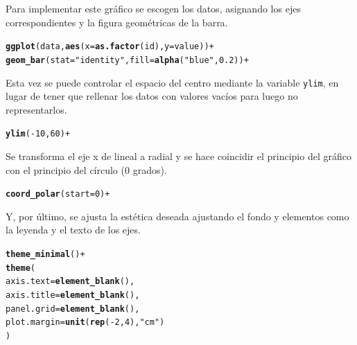 \documentclass{article}\usepackage[]{graphicx}\usepackage[]{color}
\makeatletter
\newcommand{\hlnum}[1]{\textcolor[rgb]{0.686,0.059,0.569}{#1}}%
\newcommand{\hlstr}[1]{\textcolor[rgb]{0.192,0.494,0.8}{#1}}%
\newcommand{\hlopt}[1]{\textcolor[rgb]{0,0,0}{#1}}%
\newcommand{\hlstd}[1]{\textcolor[rgb]{0.345,0.345,0.345}{#1}}%
\newcommand{\hlkwc}[1]{\textcolor[rgb]{0.333,0.667,0.333}{#1}}%
\newcommand{\hlkwd}[1]{\textcolor[rgb]{0.737,0.353,0.396}{\textbf{#1}}}%
\newenvironment{kframe}{%
 \def\at@end@of@kframe{}%
 \ifinner\ifhmode%
  \def\at@end@of@kframe{\end{minipage}}%
  \begin{minipage}{\columnwidth}%
 \fi\fi%
 \def\FrameCommand##1{\hskip\@totalleftmargin \hskip-\fboxsep
 \colorbox{shadecolor}{##1}\hskip-\fboxsep
     \hskip-\linewidth \hskip-\@totalleftmargin \hskip\columnwidth}%
 \MakeFramed {\advance\hsize-\width
   \@totalleftmargin\z@ \linewidth\hsize
   \@setminipage}}%
 {\par\unskip\endMakeFramed%
 \at@end@of@kframe}
\newenvironment{knitrout}{}{} %
\makeatother
\begin{document}
Para implementar este gr\'afico se escogen los datos, asignando los ejes correspondientes y la figura geom\'etricas de la barra.
\begin{knitrout}
\color{fgcolor}\begin{kframe}
\begin{alltt}
\hlkwd{ggplot}(data, \hlkwd{aes}(x=\hlkwd{as.factor}(id), y=value)) +
  \hlkwd{geom_bar}(stat=\hlstr{"identity"}, fill=\hlkwd{alpha}(\hlstr{"blue"},0.2)) +
\end{alltt}
\end{kframe}
\end{knitrout}
Esta vez se puede controlar el espacio del centro mediante la variable \texttt{ylim}, en lugar de tener que rellenar los datos con valores vac\'ios para luego no representarlos.
\begin{knitrout}
\color{fgcolor}\begin{kframe}
\begin{alltt}
  \hlkwd{ylim}(-10,60) +
\end{alltt}
\end{kframe}
\end{knitrout}
Se transforma el eje x de lineal a radial y se hace coincidir el principio del gr\'afico con el principio del c\'irculo (0 grados).
\begin{knitrout}
\color{fgcolor}\begin{kframe}
\begin{alltt}
  \hlkwd{coord_polar}(start = 0) +
\end{alltt}
\end{kframe}
\end{knitrout}
Y, por \'ultimo, se ajusta la est\'etica deseada ajustando el fondo y elementos como la leyenda y el texto de los ejes.
\begin{knitrout}
\color{fgcolor}\begin{kframe}
\begin{alltt}
  \hlkwd{theme_minimal}\hlstd{()} \hlopt{+}
  \hlkwd{theme}\hlstd{(}
    \hlkwc{axis.text} \hlstd{=} \hlkwd{element_blank}\hlstd{(),}
    \hlkwc{axis.title} \hlstd{=} \hlkwd{element_blank}\hlstd{(),}
    \hlkwc{panel.grid} \hlstd{=} \hlkwd{element_blank}\hlstd{(),}
    \hlkwc{plot.margin} \hlstd{=} \hlkwd{unit}\hlstd{(}\hlkwd{rep}\hlstd{(}\hlopt{-}\hlnum{2}\hlstd{,}\hlnum{4}\hlstd{),} \hlstr{"cm"}\hlstd{)}
  \hlstd{)}
\end{alltt}
\end{kframe}
\end{knitrout}
\end{document}
